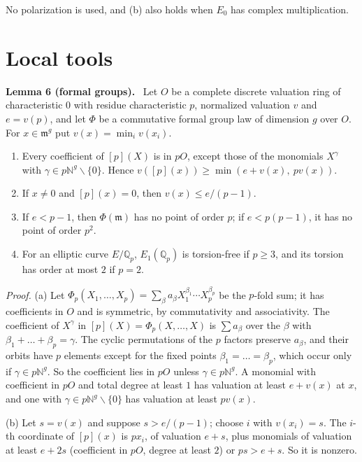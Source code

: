\documentclass[11pt]{article}
\newenvironment{statement}[1]{\par\medskip\noindent\phantomsection\textbf{#1}\ }{\par\medskip}
\newcommand{\Q}{\mathbb Q}
\begin{document}
\medskip
No polarization is used, and (b) also holds when \(E_0\) has complex multiplication.

\section{Local tools}\label{local}

\begin{statement}{Lemma 6 (formal groups).}\label{lemma-formal}
Let \(O\) be a complete discrete valuation ring of characteristic \(0\) with residue characteristic \(p\),
normalized valuation \(v\) and \(e=v(p)\), and let \(\Phi\) be a commutative formal group law of dimension \(g\) over
\(O\). For \(x\in\mathfrak m^g\) put \(v(x)=\min_iv(x_i)\).
\begin{enumerate}
\item[(a)] Every coefficient of \([p](X)\) is in \(pO\), except those of the monomials \(X^\gamma\) with
\(\gamma\in p\mathbb N^g\smallsetminus\{0\}\). Hence \(v([p](x))\ge\min(e+v(x),\ pv(x))\).
\item[(b)] If \(x\neq0\) and \([p](x)=0\), then \(v(x)\le e/(p-1)\).
\item[(c)] If \(e<p-1\), then \(\Phi(\mathfrak m)\) has no point of order \(p\); if \(e<p(p-1)\), it has no point of
order \(p^2\).
\item[(d)] For an elliptic curve \(E/\Q_p\), \(E_1(\Q_p)\) is torsion-free if \(p\ge3\), and its torsion has order
at most \(2\) if \(p=2\).
\end{enumerate}
\end{statement}

\emph{Proof.} (a) Let \(\Phi_p(X_1,\dots,X_p)=\sum_\beta a_\beta X_1^{\beta_1}\cdots X_p^{\beta_p}\) be the
\(p\)-fold sum; it has coefficients in \(O\) and is symmetric, by commutativity and associativity. The coefficient
of \(X^\gamma\) in \([p](X)=\Phi_p(X,\dots,X)\) is \(\sum a_\beta\) over the \(\beta\) with
\(\beta_1+\dots+\beta_p=\gamma\). The cyclic permutations of the \(p\) factors preserve \(a_\beta\), and their orbits
have \(p\) elements except for the fixed points \(\beta_1=\dots=\beta_p\), which occur only if \(\gamma\in
p\mathbb N^g\). So the coefficient lies in \(pO\) unless \(\gamma\in p\mathbb N^g\). A monomial with coefficient in
\(pO\) and total degree at least \(1\) has valuation at least \(e+v(x)\) at \(x\), and one with \(\gamma\in
p\mathbb N^g\smallsetminus\{0\}\) has valuation at least \(pv(x)\).

(b) Let \(s=v(x)\) and suppose \(s>e/(p-1)\); choose \(i\) with \(v(x_i)=s\). The \(i\)-th coordinate of \([p](x)\)
is \(px_i\), of valuation \(e+s\), plus monomials of valuation at least \(e+2s\) (coefficient in \(pO\), degree at
least \(2\)) or \(ps>e+s\). So it is nonzero.
\end{document}
